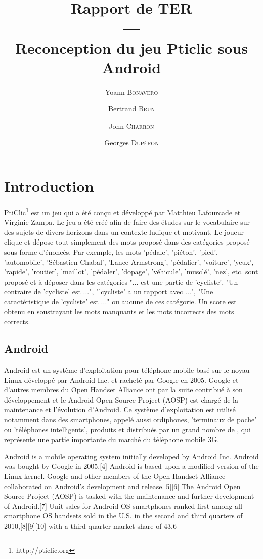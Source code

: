\documentclass[a4paper,11pt,french]{article}
\title{Rapport de TER\\---\\Reconception du jeu Pticlic sous Android}
\author{Yoann \textsc{Bonavero} \and Bertrand \textsc{Brun} \and John \textsc{Charron} \and Georges \textsc{Dupéron}}
\begin{document}
\maketitle

\setcounter{page}{0}
\pagestyle{empty}
\thispagestyle{empty}

\tableofcontents

\pagestyle{empty}
\thispagestyle{empty}
\newpage
\pagestyle{plain}


\section{Introduction}

PtiClic\footnote{http://pticlic.org} est un jeu qui a été conçu et développé par Matthieu Lafourcade et Virginie Zampa. Le jeu a été créé afin de faire des études sur le vocabulaire sur des sujets de divers horizons dans un contexte ludique et motivant. Le joueur clique et dépose tout simplement des mots proposé dans des catégories proposé sous forme d'énoncés. Par exemple, les mots 'pédale', 'piéton', 'pied', 'automobile', 'Sébastien Chabal', 'Lance Armstrong', 'pédalier', 'voiture', 'yeux', 'rapide', 'routier', 'maillot', 'pédaler', 'dopage', 'véhicule', 'musclé', 'nez', etc. sont proposé et à déposer dans les catégories "... est une partie de 'cycliste', "Un contraire de 'cycliste' est ...", "'cycliste' a un rapport avec ...",  "Une caractéristique de 'cycliste' est ..." ou aucune de ces catégorie. Un score est obtenu en soustrayant les mots manquants et les mots incorrects des mots corrects.


\subsection{Android}

Android est un système d'exploitation pour téléphone mobile basé sur le noyau Linux développé par Android Inc. et racheté par Google en 2005. Google et d'autres membres du Open Handset Alliance ont par la suite contribué à son développement et le Android Open Source Project (AOSP) est chargé de la maintenance et l'évolution d'Android. Ce système d'exploitation est utilisé notamment dans des smartphones, appelé aussi ordiphones, 'terminaux de poche' ou 'téléphones intelligents', produits et distribués par un grand nombre de , qui représente une partie importante du marché du téléphone mobile 3G. 



Android is a mobile operating system initially developed by Android Inc. Android was bought by Google in 2005.[4] Android is based upon a modified version of the Linux kernel. Google and other members of the Open Handset Alliance collaborated on Android's development and release.[5][6] The Android Open Source Project (AOSP) is tasked with the maintenance and further development of Android.[7] Unit sales for Android OS smartphones ranked first among all smartphone OS handsets sold in the U.S. in the second and third quarters of 2010,[8][9][10] with a third quarter market share of 43.6%
\end{document}
